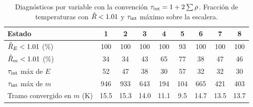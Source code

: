 \begin{table}[H]
\centering\small
\caption{Diagnósticos por variable con la convención $\tau_{\mathrm{int}}=1+2\sum\rho$. Fracción de temperaturas con $\hat R<1.01$ y $\tau_{\mathrm{int}}$ máximo sobre la escalera.}
\begin{tabular}{lcccccccc}
\toprule
Estado & 1 & 2 & 3 & 4 & 5 & 6 & 7 & 8\\
\midrule
$\hat R_E<1.01$ (\%) & 100 & 100 & 100 & 100 & 93 & 100 & 100 & 100\\
$\hat R_m<1.01$ (\%) & 34 & 34 & 43 & 65 & 77 & 38 & 47 & 46\\
$\tau_{\mathrm{int}}$ máx de $E$ & 52 & 47 & 38 & 30 & 57 & 32 & 32 & 30\\
$\tau_{\mathrm{int}}$ máx de $m$ & 946 & 933 & 643 & 194 & 104 & 665 & 421 & 403\\
Tramo convergido en $m$ (K) & 15.5 & 15.3 & 14.0 & 11.1 & 9.5 & 14.7 & 13.5 & 13.7\\
\bottomrule
\end{tabular}
\end{table}
